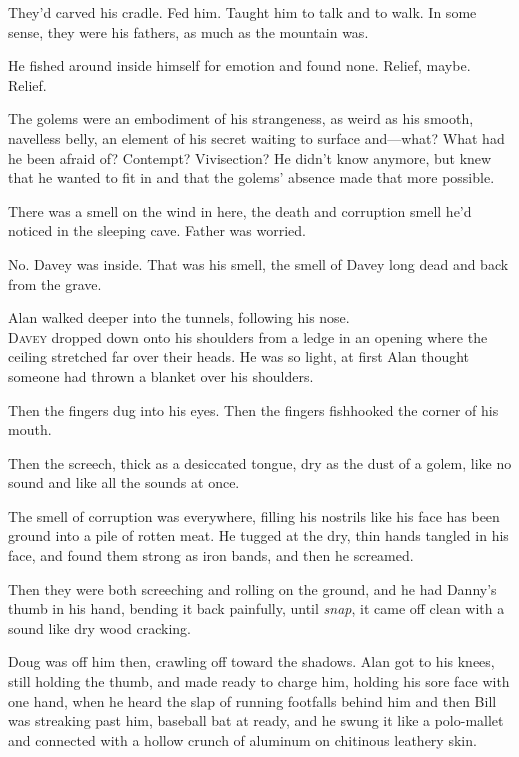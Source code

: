 They'd carved his cradle.  Fed him.  Taught him to talk and to walk. 
In some sense, they were his fathers, as much as the mountain was.

He fished around inside himself for emotion and found none.  Relief,
maybe.  Relief.

The golems were an embodiment of his strangeness, as weird as his
smooth, navelless belly, an element of his secret waiting to surface
and---what?  What had he been afraid of?  Contempt?  Vivisection?  He
didn't know anymore, but knew that he wanted to fit in and that the
golems' absence made that more possible.

There was a smell on the wind in here, the death and corruption smell
he'd noticed in the sleeping cave.  Father was worried.

No.  Davey was inside.  That was his smell, the smell of Davey long
dead and back from the grave.

Alan walked deeper into the tunnels, following his nose.
\\
\lettrine[lines=3, lhang=.5, nindent=0pt, findent=2pt]{D}{avey} dropped down onto his shoulders from a ledge in an opening where
the ceiling stretched far over their heads.  He was so light, at first
Alan thought someone had thrown a blanket over his shoulders.

Then the fingers dug into his eyes.  Then the fingers fishhooked the
corner of his mouth.

Then the screech, thick as a desiccated tongue, dry as the dust of a
golem, like no sound and like all the sounds at once.

The smell of corruption was everywhere, filling his nostrils like his
face has been ground into a pile of rotten meat.  He tugged at the
dry, thin hands tangled in his face, and found them strong as iron
bands, and then he screamed.

Then they were both screeching and rolling on the ground, and he had
Danny's thumb in his hand, bending it back painfully, until
\textit{snap}, it came off clean with a sound like dry wood cracking.

Doug was off him then, crawling off toward the shadows.  Alan got to
his knees, still holding the thumb, and made ready to charge him,
holding his sore face with one hand, when he heard the slap of running
footfalls behind him and then Bill was streaking past him, baseball
bat at ready, and he swung it like a polo-mallet and connected with a
hollow crunch of aluminum on chitinous leathery skin.

